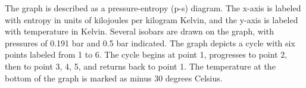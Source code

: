 The graph is described as a pressure-entropy (p-s) diagram. The x-axis is labeled with entropy in units of kilojoules per kilogram Kelvin, and the y-axis is labeled with temperature in Kelvin. Several isobars are drawn on the graph, with pressures of 0.191 bar and 0.5 bar indicated. The graph depicts a cycle with six points labeled from 1 to 6. The cycle begins at point 1, progresses to point 2, then to point 3, 4, 5, and returns back to point 1. The temperature at the bottom of the graph is marked as minus 30 degrees Celsius.